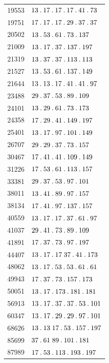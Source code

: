 \begin{longtable}{@{}r|l@{}}
19553 & $13\mathbin{.} 17\mathbin{.} 17\mathbin{.} 17\mathbin{.} 41\mathbin{.} 73$\\
19751 & $17\mathbin{.} 17\mathbin{.} 17\mathbin{.} 29\mathbin{.} 37\mathbin{.} 37$\\
20502 & $13\mathbin{.} 53\mathbin{.} 61\mathbin{.} 73\mathbin{.} 137$\\
21009 & $13\mathbin{.} 17\mathbin{.} 37\mathbin{.} 137\mathbin{.} 197$\\
21319 & $13\mathbin{.} 37\mathbin{.} 37\mathbin{.} 113\mathbin{.} 113$\\
21527 & $13\mathbin{.} 53\mathbin{.} 61\mathbin{.} 137\mathbin{.} 149$\\
21644 & $13\mathbin{.} 13\mathbin{.} 17\mathbin{.} 41\mathbin{.} 41\mathbin{.} 97$\\
23488 & $29\mathbin{.} 37\mathbin{.} 53\mathbin{.} 89\mathbin{.} 109$\\
24101 & $13\mathbin{.} 29\mathbin{.} 61\mathbin{.} 73\mathbin{.} 173$\\
24358 & $17\mathbin{.} 29\mathbin{.} 41\mathbin{.} 149\mathbin{.} 197$\\
25401 & $13\mathbin{.} 17\mathbin{.} 97\mathbin{.} 101\mathbin{.} 149$\\
26707 & $29\mathbin{.} 29\mathbin{.} 37\mathbin{.} 73\mathbin{.} 157$\\
30467 & $17\mathbin{.} 41\mathbin{.} 41\mathbin{.} 109\mathbin{.} 149$\\
31226 & $17\mathbin{.} 53\mathbin{.} 61\mathbin{.} 113\mathbin{.} 157$\\
33381 & $29\mathbin{.} 37\mathbin{.} 53\mathbin{.} 97\mathbin{.} 101$\\
38011 & $13\mathbin{.} 41\mathbin{.} 89\mathbin{.} 97\mathbin{.} 157$\\
38134 & $17\mathbin{.} 41\mathbin{.} 97\mathbin{.} 137\mathbin{.} 157$\\
40559 & $13\mathbin{.} 17\mathbin{.} 17\mathbin{.} 37\mathbin{.} 61\mathbin{.} 97$\\
41037 & $29\mathbin{.} 41\mathbin{.} 73\mathbin{.} 89\mathbin{.} 109$\\
41891 & $17\mathbin{.} 37\mathbin{.} 73\mathbin{.} 97\mathbin{.} 197$\\
44407 & $13\mathbin{.} 17\mathbin{.} 17\;37\mathbin{.} 41\mathbin{.} 173$\\
48062 & $13\mathbin{.} 17\mathbin{.} 53\mathbin{.} 53\mathbin{.} 61\mathbin{.} 61$\\
49943 & $17\mathbin{.} 37\mathbin{.} 73\mathbin{.} 157\mathbin{.} 173$\\
50051 & $13\mathbin{.} 17\mathbin{.} 173\mathbin{.} 181\mathbin{.} 181$\\
56913 & $13\mathbin{.} 17\mathbin{.} 37\mathbin{.} 37\mathbin{.} 53\mathbin{.} 101$\\
60347 & $13\mathbin{.} 17\mathbin{.} 29\mathbin{.} 29\mathbin{.} 97\mathbin{.} 101$\\
68626 & $13\mathbin{.} 13\;17\mathbin{.} 53\mathbin{.} 157\mathbin{.} 197$\\
85699 & $37\mathbin{.} 61\;89\mathbin{.} 101\mathbin{.} 181$\\
87989 & $17\mathbin{.} 53\mathbin{.} 113\mathbin{.} 193\mathbin{.} 197$\\

\end{longtable}
